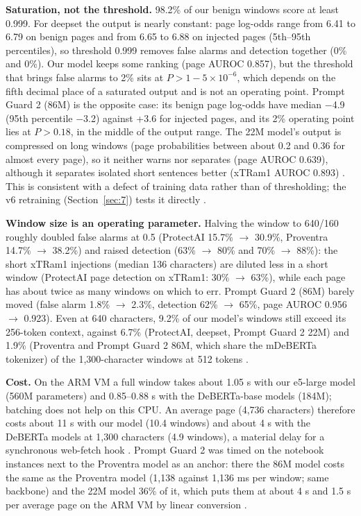 \documentclass[11pt]{article}
\begin{document}
\textbf{Saturation, not the threshold.} 98.2\% of our benign windows score at least 0.999. For deepset the output is nearly constant: page log-odds range from 6.41 to 6.79 on benign pages and from 6.65 to 6.88 on injected pages (5th–95th percentiles), so threshold 0.999 removes false alarms and detection together (0\% and 0\%). Our model keeps some ranking (page AUROC 0.857), but the threshold that brings false alarms to 2\% sits at $P > 1-5\times10^{-6}$, which depends on the fifth decimal place of a saturated output and is not an operating point. Prompt Guard 2 (86M) is the opposite case: its benign page log-odds have median \ensuremath{-}4.9 (95th percentile \ensuremath{-}3.2) against +3.6 for injected pages, and its 2\% operating point lies at $P > 0.18$, in the middle of the output range. The 22M model's output is compressed on long windows (page probabilities between about 0.2 and 0.36 for almost every page), so it neither warns nor separates (page AUROC 0.639), although it separates isolated short sentences better (xTRam1 AUROC 0.893)%
. This is consistent with a defect of training data rather than of thresholding; the v6 retraining (Section~\ref{sec:7}) tests it directly%
.

\textbf{Window size is an operating parameter.} Halving the window to 640/160 roughly doubled false alarms at 0.5 (ProtectAI 15.7\% \ensuremath{\rightarrow} 30.9\%, Proventra 14.7\% \ensuremath{\rightarrow} 38.2\%) and raised detection (63\% \ensuremath{\rightarrow} 80\% and 70\% \ensuremath{\rightarrow} 88\%): the short xTRam1 injections (median 136 characters) are diluted less in a short window (ProtectAI page detection on xTRam1: 30\% \ensuremath{\rightarrow} 63\%), while each page has about twice as many windows on which to err. Prompt Guard 2 (86M) barely moved (false alarm 1.8\% \ensuremath{\rightarrow} 2.3\%, detection 62\% \ensuremath{\rightarrow} 65\%, page AUROC 0.956 \ensuremath{\rightarrow} 0.923). Even at 640 characters, 9.2\% of our model's windows still exceed its 256-token context, against 6.7\% (ProtectAI, deepset, Prompt Guard 2 22M) and 1.9\% (Proventra and Prompt Guard 2 86M, which share the mDeBERTa tokenizer) of the 1,300-character windows at 512 tokens%
.

\textbf{Cost.} On the ARM VM a full window takes about 1.05 s with our e5-large model (560M parameters) and 0.85–0.88 s with the DeBERTa-base models (184M); batching does not help on this CPU. An average page (4,736 characters) therefore costs about 11 s with our model (10.4 windows) and about 4 s with the DeBERTa models at 1,300 characters (4.9 windows), a material delay for a synchronous web-fetch hook%
. Prompt Guard 2 was timed on the notebook instances next to the Proventra model as an anchor: there the 86M model costs the same as the Proventra model (1,138 against 1,136 ms per window; same backbone) and the 22M model 36\% of it, which puts them at about 4 s and 1.5 s per average page on the ARM VM by linear conversion%
.
\end{document}

